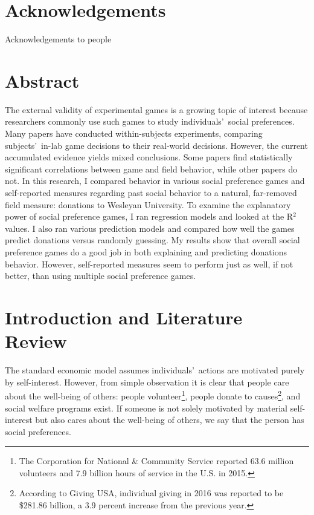 \documentclass[12pt]{article}
\begin{document}


\newpage
\singlespacing
\tableofcontents
\thispagestyle{empty}


\newpage

\clearpage
{} 
\section*{Acknowledgements}
Acknowledgements to people


\newpage

\section*{Abstract}

\doublespacing
The external validity of experimental games is a growing topic of interest because researchers commonly use such games to study individuals\rq \ social preferences. Many papers have conducted within-subjects experiments, comparing subjects\rq \ in-lab game decisions to their real-world decisions. However, the current accumulated evidence yields mixed conclusions. Some papers find statistically significant correlations between game and field behavior, while other papers do not. In this research, I compared behavior in various social preference games and self-reported measures regarding past social behavior to a natural, far-removed field measure: donations to Wesleyan University. To examine the explanatory power of social preference games, I ran regression models and looked at the R$^{2}$ values. I also ran various prediction models and compared how well the games predict donations versus randomly guessing. My results show that overall social preference games do a good job in both explaining and predicting donations behavior. However, self-reported measures seem to perform just as well, if not better, than using multiple social preference games. 



\newpage


\doublespacing
\section{Introduction and Literature Review}

The standard economic model assumes individuals\rq \ actions are motivated purely by self-interest. However, from simple observation it is clear that people care about the well-being of others: people volunteer\footnote{The Corporation for National \& Community Service reported 63.6 million volunteers and 7.9 billion hours of service in the U.S. in 2015.}, people donate to causes\footnote{According to Giving USA, individual giving in 2016 was reported to be \$281.86 billion, a 3.9 percent increase from the previous year.}, and social welfare programs exist. If someone is not solely motivated by material self-interest but also cares about the well-being of others, we say that the person has social preferences. 
\end{document}
